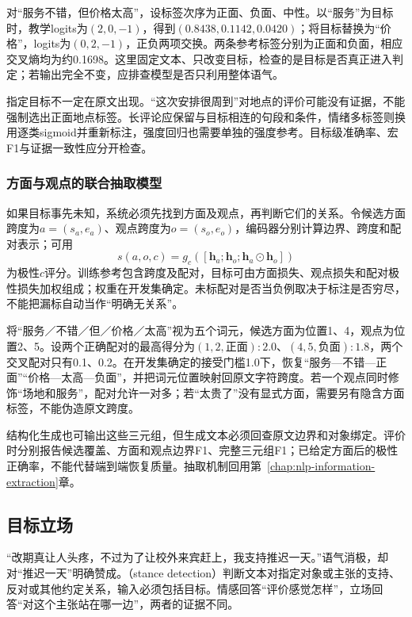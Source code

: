 对“服务不错，但价格太高”，设标签次序为正面、负面、中性。以“服务”为目标时，教学logits为$(2,0,-1)$，得到$(0.8438,0.1142,0.0420)$；将目标替换为“价格”，logits为$(0,2,-1)$，正负两项交换。两条参考标签分别为正面和负面，相应交叉熵均为约0.1698。这里固定文本、只改变目标，检查的是目标是否真正进入判定；若输出完全不变，应排查模型是否只利用整体语气。

指定目标不一定在原文出现。“这次安排很周到”对地点的评价可能没有证据，不能强制选出正面地点标签。长评论应保留与目标相连的句段和条件，情绪多标签则换用逐类sigmoid并重新标注，强度回归也需要单独的强度参考。目标级准确率、宏F1与证据一致性应分开检查。

\subsubsection{方面与观点的联合抽取模型}
\label{sec:nlp-classification-aspect-opinion}

如果目标事先未知，系统必须先找到方面及观点，再判断它们的关系。令候选方面跨度为$a=(s_a,e_a)$、观点跨度为$o=(s_o,e_o)$，编码器分别计算边界、跨度和配对表示；可用
\[
  s(a,o,c)=g_c([\bm h_a;\bm h_o;\bm h_a\odot\bm h_o])
\]
为极性$c$评分。训练参考包含跨度及配对，目标可由方面损失、观点损失和配对极性损失加权组成；权重在开发集确定。未标配对是否当负例取决于标注是否穷尽，不能把漏标自动当作“明确无关系”。

将“服务／不错／但／价格／太高”视为五个词元，候选方面为位置1、4，观点为位置2、5。设两个正确配对的最高得分为$(1,2,\text{正面}):2.0$、$(4,5,\text{负面}):1.8$，两个交叉配对只有0.1、0.2。在开发集确定的接受门槛1.0下，恢复“服务—不错—正面”“价格—太高—负面”，并把词元位置映射回原文字符跨度。若一个观点同时修饰“场地和服务”，配对允许一对多；若“太贵了”没有显式方面，需要另有隐含方面标签，不能伪造原文跨度。

结构化生成也可输出这些三元组，但生成文本必须回查原文边界和对象绑定。评价时分别报告候选覆盖、方面和观点边界F1、完整三元组F1；已给定方面后的极性正确率，不能代替端到端恢复质量。抽取机制回用第~\ref{chap:nlp-information-extraction}章。

\subsection{目标立场}
\label{sec:nlp-classification-stance}

“改期真让人头疼，不过为了让校外来宾赶上，我支持推迟一天。”语气消极，却对“推迟一天”明确赞成。（stance detection）判断文本对指定对象或主张的支持、反对或其他约定关系，输入必须包括目标。情感回答“评价感觉怎样”，立场回答“对这个主张站在哪一边”，两者的证据不同。

